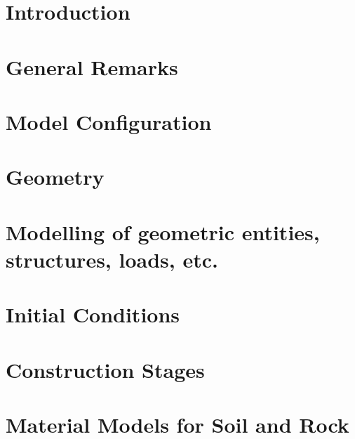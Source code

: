 \documentclass[12pt,a4paper]{report}
\title{\varTitle}
\author{\varAuthor}
\date{\varDate}
\begin{document}



\tableofcontents

\chapter{Introduction}
\label{chap:introduction}


\chapter{General Remarks}
\label{chap:general}


\chapter{Model Configuration}
\label{chap:setup}


\chapter{Geometry}
\label{chap:geometry}


\chapter{Modelling of geometric entities, structures, loads, etc.}
\label{chap:entities}


\chapter{Initial Conditions}
\label{chap:initial}


\chapter{Construction Stages}
\label{chap:stages}


\chapter{Material Models for Soil and Rock}
\label{chap:materials}

\end{document}
